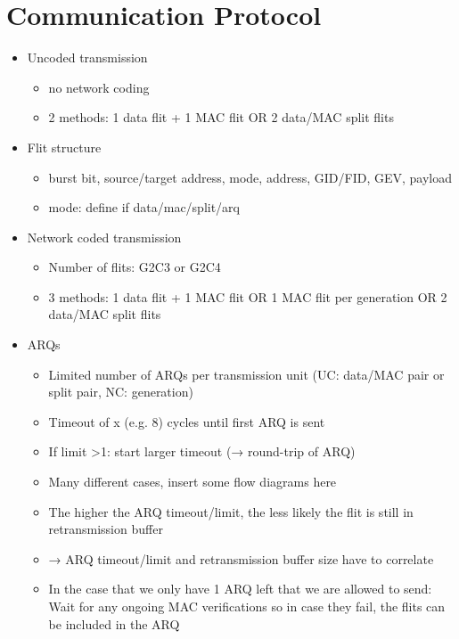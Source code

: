 \documentclass[
	paper=a4,
	fontsize=11pt,
	parskip=full %
]{scrreprt}
\begin{document}
    \chapter{Communication Protocol}
    \begin{itemize}
        \item Uncoded transmission
            \begin{itemize}
                \item no network coding
                \item 2 methods: 1 data flit + 1 MAC flit OR 2 data/MAC split flits
            \end{itemize}
        \item Flit structure
            \begin{itemize}
                \item burst bit, source/target address, mode, address, GID/FID, GEV, payload
                \item mode: define if data/mac/split/arq
            \end{itemize}
        \item Network coded transmission
            \begin{itemize}
                \item Number of flits: G2C3 or G2C4
                \item 3 methods: 1 data flit + 1 MAC flit OR 1 MAC flit per generation OR 2 data/MAC split flits
            \end{itemize}
        \item ARQs
            \begin{itemize}
                \item Limited number of ARQs per transmission unit (UC: data/MAC pair or split pair, NC: generation)
                \item Timeout of x (e.g. 8) cycles until first ARQ is sent
                \item If limit >1: start larger timeout (→ round-trip of ARQ)
                \item Many different cases, insert some flow diagrams here
                \item The higher the ARQ timeout/limit, the less likely the flit is still in retransmission buffer
                \item → ARQ timeout/limit and retransmission buffer size have to correlate
                \item In the case that we only have 1 ARQ left that we are allowed to send: Wait for any ongoing MAC verifications
                    so in case they fail, the flits can be included in the ARQ
            \end{itemize}
    \end{itemize}
\end{document}
